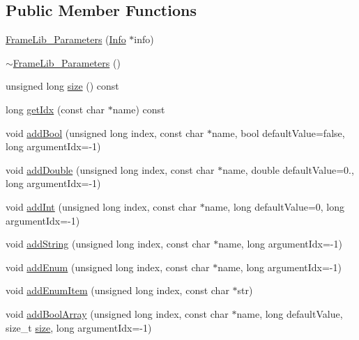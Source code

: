 \subsection*{Public Member Functions}
\begin{DoxyCompactItemize}
\item 
\hyperlink{class_frame_lib___parameters_a901d16f8654b147d21cf2b87d3ed8a14}{Frame\+Lib\+\_\+\+Parameters} (\hyperlink{class_frame_lib___parameters_1_1_info}{Info} $\ast$info)
\item 
\hyperlink{class_frame_lib___parameters_a5bb469337e8a213ba9f397bc6af269c8}{$\sim$\+Frame\+Lib\+\_\+\+Parameters} ()
\item 
unsigned long \hyperlink{class_frame_lib___parameters_a391d0cb37c904981f7ad52bc0ba1b111}{size} () const
\item 
long \hyperlink{class_frame_lib___parameters_a6188f2b27de6850129ea084c99aa4669}{get\+Idx} (const char $\ast$name) const
\item 
void \hyperlink{class_frame_lib___parameters_ad975cc435f4fa2006e1a722dad784d9a}{add\+Bool} (unsigned long index, const char $\ast$name, bool default\+Value=false, long argument\+Idx=-\/1)
\item 
void \hyperlink{class_frame_lib___parameters_ab05bf4cd30eecd26bba972efd171798c}{add\+Double} (unsigned long index, const char $\ast$name, double default\+Value=0., long argument\+Idx=-\/1)
\item 
void \hyperlink{class_frame_lib___parameters_a9cb86d9fa829686a58e7776dcc45b60a}{add\+Int} (unsigned long index, const char $\ast$name, long default\+Value=0, long argument\+Idx=-\/1)
\item 
void \hyperlink{class_frame_lib___parameters_a54881a00c48e949914b130383c110a0a}{add\+String} (unsigned long index, const char $\ast$name, long argument\+Idx=-\/1)
\item 
void \hyperlink{class_frame_lib___parameters_ae79973b1261a0a63a14f6c4b299d0fb6}{add\+Enum} (unsigned long index, const char $\ast$name, long argument\+Idx=-\/1)
\item 
void \hyperlink{class_frame_lib___parameters_a9840a17de7f4c3078d26f23ec88eb02d}{add\+Enum\+Item} (unsigned long index, const char $\ast$str)
\item 
void \hyperlink{class_frame_lib___parameters_a9239184fd366b1cbaeec545577c20ab2}{add\+Bool\+Array} (unsigned long index, const char $\ast$name, long default\+Value, size\+\_\+t \hyperlink{class_frame_lib___parameters_a391d0cb37c904981f7ad52bc0ba1b111}{size}, long argument\+Idx=-\/1)

\end{DoxyCompactItemize}
